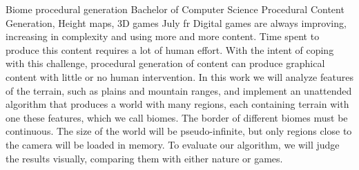 \documentclass[tg]{mdtuffs}
\begin{document}
\begin{englishabstract}
{Biome procedural generation}
{Bachelor of Computer Science}
{Procedural Content Generation, Height maps, 3D games}
{July}
{fr}
Digital games are always improving, increasing in complexity and using more and more content.
Time spent to produce this content requires a lot of human effort.
With the intent of coping with this challenge, procedural generation of content can produce graphical content with little or no human intervention.
In this work we will analyze features of the terrain, such as plains and mountain ranges, and 
implement an unattended algorithm that produces a world with many regions, each containing terrain with one these features, which we call biomes. 
The border of different biomes must be continuous. 
The size of the world will be pseudo-infinite, but only regions close to the camera will be loaded in memory.
To evaluate our algorithm, we will judge the results visually, comparing them with either nature or games.

\end{englishabstract}


\listoffigures

\listoftables


\end{document}
